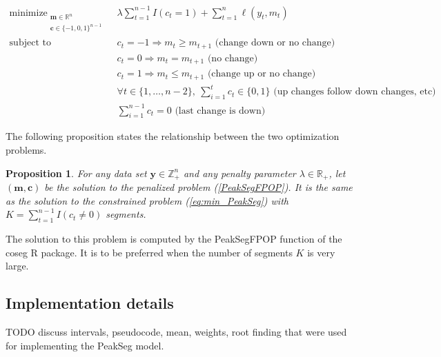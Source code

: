 \documentclass{article}
\newtheorem{proposition}{Proposition}
\DeclareMathOperator*{\minimize}{minimize}
\newcommand{\ZZ}{\mathbb Z}
\newcommand{\RR}{\mathbb R}
\begin{document}
\begin{align}
\minimize_{\substack{
  \mathbf m\in\RR^{n}
\\
  \mathbf c\in\{-1,0,1\}^{n-1}
  }} &\ \ 
\lambda\sum_{t=1}^{n-1} I(c_t =1)
+
\sum_{t=1}^n \ell(y_t, m_t) 
  \label{PeakSegFPOP}
\\
    \text{subject to} 
& \ \ c_t = -1 \Rightarrow m_{t} \geq m_{t+1} \text{ (change down or no change)}
\nonumber\\
& \ \ c_t = 0 \Rightarrow m_{t} = m_{t+1}  \text{ (no change)}
\nonumber\\
& \ \ c_t = 1 \Rightarrow m_{t} \leq m_{t+1} \text{ (change up or no change)}
\nonumber\\
& \ \ \forall t\in\{1, \dots, n-2\},\ \sum_{i=1}^t c_t \in\{0, 1\}
\text{ (up changes follow down changes, etc)}
\nonumber\\
& \ \ \sum_{i=1}^{n-1} c_t = 0 \text{ (last change is down)}
\nonumber
\end{align}

The following proposition states the
relationship between the two optimization problems.

\begin{proposition}
  For any data set $\mathbf y\in\ZZ_+^n$ and any penalty parameter
  $\lambda\in\RR_+$, let $(\mathbf m,\mathbf c)$ be the solution to
  the penalized problem (\ref{PeakSegFPOP}). It is the same as the
  solution to the constrained problem (\ref{eq:min_PeakSeg}) with
  $K=\sum_{t=1}^{n-1} I(c_t \neq 0)$ segments.
\end{proposition}


The solution to this problem is computed by the PeakSegFPOP function
of the coseg R package. It is to be preferred when the number of
segments $K$ is very large. 

\subsection{Implementation details}
\label{sec:implementation-details}
TODO discuss intervals, pseudocode, mean, weights, root finding that
were used for implementing the PeakSeg model.
\end{document}
